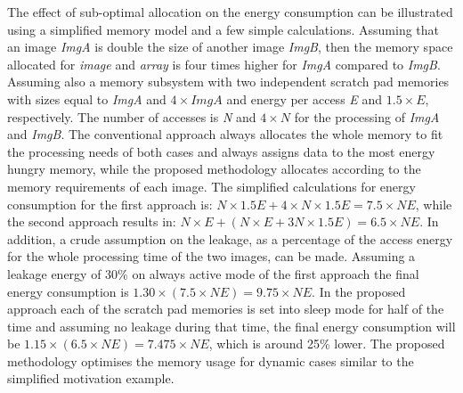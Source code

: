 \documentclass{acm_proc_article-sp}
\begin{document}
The effect of sub-optimal allocation on the energy consumption can be illustrated using a simplified memory model and a few simple calculations. Assuming that an image \textit{ImgA} is double the size of another image \textit{ImgB}, then the memory space allocated for \textit{image} and \textit{array} is four times higher for \textit{ImgA} compared to \textit{ImgB}. Assuming also a memory subsystem with two independent scratch pad memories with sizes equal to \textit{ImgA} and $4 \times \textit{ImgA}$ and energy per access \textit{E} and $1.5 \times E$, respectively. The number of accesses is \textit{N} and $ 4 \times N$ for the processing of \textit{ImgA} and \textit{ImgB}. The conventional approach always allocates the whole memory to fit the processing needs of both cases and always assigns data to the most energy hungry memory, while the proposed methodology allocates according to the memory requirements of each image. The simplified calculations for energy consumption for the first approach is: \begin{math}N \times 1.5E + 4 \times N \times 1.5E = 7.5 \times NE\end{math}, while the second approach results in: \begin{math}N \times E + ( N \times E + 3N \times 1.5E ) = 6.5 \times NE \end{math}. In addition, a crude assumption on the leakage, as a percentage of the access energy for the whole processing time of the two images, can be made. Assuming a leakage energy of 30\% on always active mode of the first approach the final energy consumption is $ 1.30 \times ( 7.5 \times NE )  = 9.75 \times NE$. In the proposed approach each of the scratch pad memories is set into sleep mode for half of the time and assuming no leakage during that time, the final energy consumption will be $ 1.15 \times ( 6.5 \times NE )  = 7.475 \times NE$, which is around 25\% lower. The proposed methodology optimises the memory usage for dynamic cases similar to the simplified motivation example.


\end{document}

